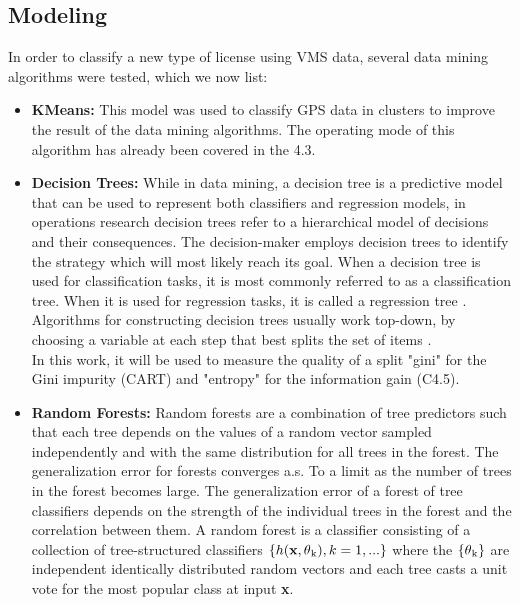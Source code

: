 \subsection{Modeling} %
\label{sub:modeling}
In order to classify a new type of license using VMS data, several data mining algorithms were tested, which we now list:
\begin{itemize}
\item \textbf{ KMeans:} This model was used to classify GPS data in clusters to improve the result of the data mining algorithms. The operating mode of this algorithm has already been covered in the 4.3.

\item \textbf{ Decision Trees: }
While in data mining, a decision tree is a predictive model that can be used to represent both classifiers and regression models, in operations research decision trees refer to a hierarchical model of decisions and their consequences\cite{Rokach2014}. The decision-maker employs decision trees to identify the strategy which will most likely reach its goal. When a decision tree is used for classification tasks, it is most commonly referred to as a classification tree. When it is used for regression tasks, it is called a regression tree \cite{Rokach2014}.
Algorithms for constructing decision trees usually work top-down, by choosing a variable at each step that best splits the set of items \cite{ApplicationsReviews}.\\
In this work, it will be used to measure the quality of a split "gini" for the Gini impurity (CART)\cite{DTAnalysis} and "entropy" for the information gain (C4.5)\cite{DTAnalysis}.

\item \textbf{ Random Forests: }
Random forests are a combination of tree predictors such that each tree depends on the values of a random vector sampled independently and with the same distribution for all trees in the forest\cite{Breiman2001}. The generalization error for forests converges a.s. To a limit as the number of trees in the forest becomes large. The generalization error of a forest of tree classifiers depends on the strength of the individual trees in the forest and the correlation between them.
A random forest is a classifier consisting of a collection of tree-structured
classifiers \(\{h(\textbf{x}, \theta \textsubscript{k} ), k = 1,...\}\) where the \( \{ \theta \textsubscript{k} \}\) are independent identically distributed
random vectors and each tree casts a unit vote for the most popular class at input \textbf{x}\cite{Breiman2001}.



\end{itemize}
